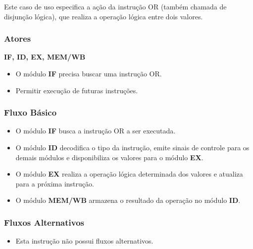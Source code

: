 
Este caso de uso especifica a ação da instrução OR (também chamada de disjunção lógica), que realiza a operação lógica entre dois valores.
 
\subsubsection*{Atores}
\textbf{IF, ID, EX, MEM/WB}

\preconditions 
\begin{itemize}
 \item O módulo \textbf{IF} precisa buscar uma instrução OR.
\end{itemize}

\postconditions
\begin{itemize}	
  \item Permitir execução de futuras instruções.
\end{itemize}

\subsubsection*{Fluxo Básico}
\begin{itemize}
\item O módulo \textbf{IF} busca a instrução OR a ser executada.
\item O módulo \textbf{ID} decodifica o tipo da instrução, emite sinais de controle para os demais módulos e disponibiliza os valores para o módulo \textbf{EX}.
\item O módulo \textbf{EX} realiza a operação lógica determinada dos valores e atualiza para a próxima instrução.
\item O módulo \textbf{MEM/WB} armazena o resultado da operação no módulo \textbf{ID}.
\end{itemize}

\subsubsection*{Fluxos Alternativos}
\begin{itemize}
\item Esta instrução não possui fluxos alternativos.
\end{itemize}

%		


